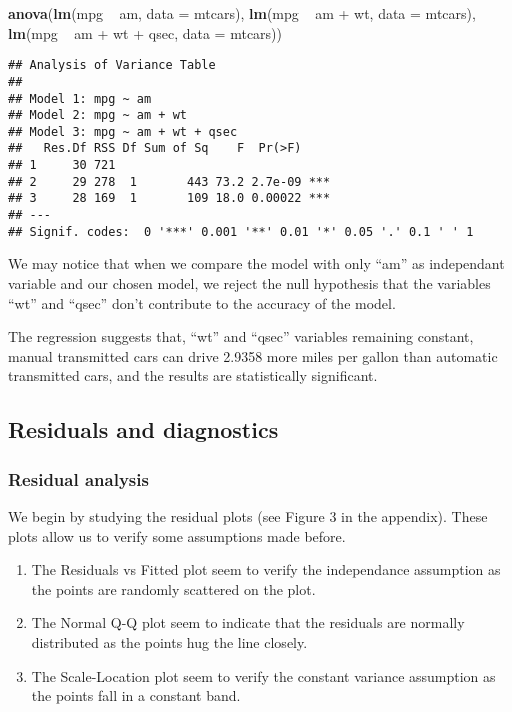 \documentclass[a3paper]{article}
\newenvironment{Shaded}{\begin{snugshade}}{\end{snugshade}}
\newcommand{\KeywordTok}[1]{\textcolor[rgb]{0.13,0.29,0.53}{\textbf{{#1}}}}
\newcommand{\DataTypeTok}[1]{\textcolor[rgb]{0.13,0.29,0.53}{{#1}}}
\newcommand{\StringTok}[1]{\textcolor[rgb]{0.31,0.60,0.02}{{#1}}}
\newcommand{\NormalTok}[1]{{#1}}
\begin{document}
\begin{Shaded}
\begin{Highlighting}[]
\KeywordTok{anova}\NormalTok{(}\KeywordTok{lm}\NormalTok{(mpg ~}\StringTok{ }\NormalTok{am, }\DataTypeTok{data =} \NormalTok{mtcars), }\KeywordTok{lm}\NormalTok{(mpg ~}\StringTok{ }\NormalTok{am +}\StringTok{ }\NormalTok{wt, }\DataTypeTok{data =} \NormalTok{mtcars), }\KeywordTok{lm}\NormalTok{(mpg ~}\StringTok{ }\NormalTok{am +}\StringTok{ }\NormalTok{wt +}\StringTok{ }\NormalTok{qsec, }\DataTypeTok{data =} \NormalTok{mtcars))}
\end{Highlighting}
\end{Shaded}

\begin{verbatim}
## Analysis of Variance Table
## 
## Model 1: mpg ~ am
## Model 2: mpg ~ am + wt
## Model 3: mpg ~ am + wt + qsec
##   Res.Df RSS Df Sum of Sq    F  Pr(>F)    
## 1     30 721                              
## 2     29 278  1       443 73.2 2.7e-09 ***
## 3     28 169  1       109 18.0 0.00022 ***
## ---
## Signif. codes:  0 '***' 0.001 '**' 0.01 '*' 0.05 '.' 0.1 ' ' 1
\end{verbatim}

We may notice that when we compare the model with only ``am'' as
independant variable and our chosen model, we reject the null hypothesis
that the variables ``wt'' and ``qsec'' don't contribute to the accuracy
of the model.

The regression suggests that, ``wt'' and ``qsec'' variables remaining
constant, manual transmitted cars can drive 2.9358 more miles per gallon
than automatic transmitted cars, and the results are statistically
significant.

\subsection{Residuals and diagnostics}\label{residuals-and-diagnostics}

\subsubsection{Residual analysis}\label{residual-analysis}

We begin by studying the residual plots (see Figure 3 in the appendix).
These plots allow us to verify some assumptions made before.

\begin{enumerate}
\def\labelenumi{\arabic{enumi}.}
\setcounter{enumi}{2}
\itemsep1pt\parskip0pt
\item
  The Residuals vs Fitted plot seem to verify the independance
  assumption as the points are randomly scattered on the plot.
\item
  The Normal Q-Q plot seem to indicate that the residuals are normally
  distributed as the points hug the line closely.
\item
  The Scale-Location plot seem to verify the constant variance
  assumption as the points fall in a constant band.
\end{enumerate}
\end{document}
